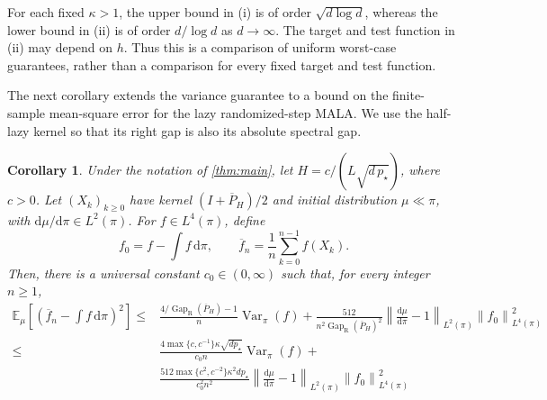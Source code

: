 \documentclass[11pt]{article}
\newtheorem{corollary}[corollary]{Corollary}
\newcommand{\E}{\mathbb E}
\newcommand{\Var}{\operatorname{Var}}
\newcommand{\Gap}{\operatorname{Gap}_{\mathrm{R}}}
\newcommand{\norm}[1]{\left\lVert #1\right\rVert}
\newcommand{\1}{\mathbf 1}
\newcommand{\df}{\mathrm{d}}
\begin{document}
	For each fixed $\kappa>1$, the upper bound in (i) is of order
	$\sqrt{d\log d}$, whereas the lower bound in (ii) is of order
	$d/\log d$ as $d\to\infty$. The target and test function in (ii)
	may depend on $h$. Thus this is a comparison of uniform
	worst-case guarantees, rather than a comparison for every fixed
	target and test function.
	
	
	
	The next corollary extends the variance guarantee to a bound on the
	finite-sample mean-square error for the lazy randomized-step MALA. We use the half-lazy kernel
	so that its right gap is also its absolute spectral gap.
	
	\begin{corollary}\label{cor:nonstationary-variance}
		Under the notation of \cref{thm:main}, let
		$H=c/(L\sqrt{d\,p_\star})$, where $c>0$.
		Let $(X_k)_{k\geq0}$ have kernel
		$(I+\overline P_H)/2$ and initial distribution
		$\mu\ll\pi$, with $\df\mu/\df\pi\in L^2(\pi)$.
		For $f\in L^4(\pi)$, define
		\[
		f_0=f-\int f\,\df\pi,
		\qquad
		\overline f_n=\frac1n\sum_{k=0}^{n-1}f(X_k).
		\]
		Then, there is a universal constant $c_0 \in (0,\infty)$ such that, for every integer $n\geq1$,
		\begin{equation}\label{eq:nonstationary-mse}
			\begin{aligned}
				\E_\mu\left[
				\left(\overline f_n-\int f\,\df\pi\right)^2
				\right]
				\leq&
				\frac{4/\Gap(\overline P_H)-1}{n} \Var_{\pi}(f)+
				\frac{512}{n^2\Gap(\overline P_H)^2}
				\norm{\frac{\df\mu}{\df\pi}-1}_{L^2(\pi)}
				\norm{f_0}_{L^4(\pi)}^2 \\
				\leq& \frac{4 \max\{c,c^{-1}\} \kappa \sqrt{d p_{\star}}}{c_0 n} \Var_{\pi}(f) + \\
				&
				\frac{512 \max\{c^2,c^{-2}\} \kappa^2 d p_{\star} }{c_0^2 n^2 }
				\norm{\frac{\df\mu}{\df\pi}-1}_{L^2(\pi)}
				\norm{f_0}_{L^4(\pi)}^2
			\end{aligned}
		\end{equation}
	\end{corollary}
	
\end{document}
